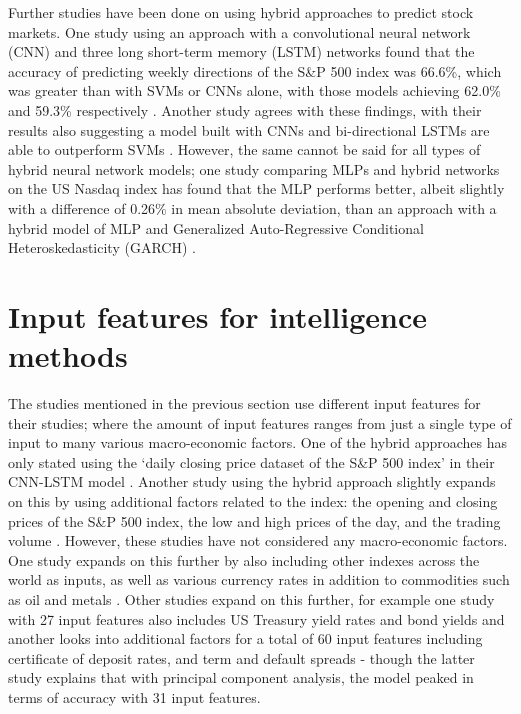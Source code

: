 Further studies have been done on using hybrid approaches to predict stock markets. One study using an approach with a convolutional neural network (CNN) and three long short-term memory (LSTM) networks found that the accuracy of predicting weekly directions of the S\&P 500 index was 66.6\%, which was greater than with SVMs or CNNs alone,  with those models achieving 62.0\% and 59.3\% respectively \parencite{hao_gao_2020}. Another study agrees with these findings, with their results also suggesting a model built with CNNs and bi-directional LSTMs are able to outperform SVMs \parencite{noveldeepcnnbilstm}. However, the same cannot be said for all types of hybrid neural network models; one study comparing MLPs and hybrid networks on the US Nasdaq index has found that the MLP performs better, albeit slightly with a difference of 0.26\% in mean absolute deviation, than an approach with a hybrid model of MLP and Generalized Auto-Regressive Conditional Heteroskedasticity (GARCH) \parencite{GURESEN201110389}.

\section{Input features for intelligence methods}
The studies mentioned in the previous section use different input features for their studies;
where the amount of input features ranges from just a single type of input to many various macro-economic factors.
One of the hybrid approaches has only stated using the `daily closing price dataset of the S\&P 500 index' in their CNN-LSTM model
\parencite{hao_gao_2020}.
Another study using the hybrid approach slightly expands on this by using additional factors related to the index:
the opening and closing prices of the S\&P 500 index, the low and high prices of the day, and the trading volume
\parencite{fitriyaningsih2019implementation,THAKKAR2020106684, hu_tang_zhang_wang_2018}. However, these studies have not considered any macro-economic factors. One study expands on this further by also including other indexes across the world as inputs, as well as various currency rates in addition to commodities such as oil and metals \parencite{shen2012stock}. Other studies expand on this further, for example one study with 27 input features also includes US Treasury yield rates and bond yields \parencite{comparisonregannsvm} and another looks into additional factors for a total of 60 input features including certificate of deposit rates, and term and default spreads \parencite{zhong2019predicting} - though the latter study explains that with principal component analysis, the model peaked in terms of accuracy with 31 input features.

